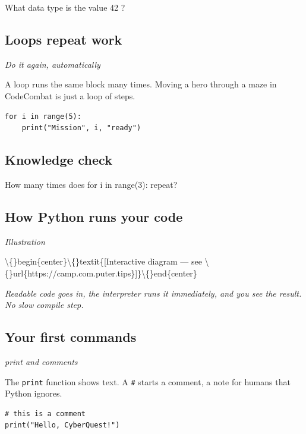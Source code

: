 \documentclass[12pt,openany]{book}
\begin{document}
What data type is the value 42 ?

\medskip

\subsection*{Loops repeat work}
{\small\itshape\color{gray}Do it again, automatically}


A loop runs the same block many times. Moving a hero through a maze in CodeCombat is just a loop of steps.

\begin{lstlisting}
for i in range(5):
    print("Mission", i, "ready")\end{lstlisting}

\medskip

\subsection*{Knowledge check}

How many times does for i in range(3): repeat?

\medskip

\subsection*{How Python runs your code}
{\small\itshape\color{gray}Illustration}

\textbackslash\{\}begin\{center\}\textbackslash\{\}textit\{[Interactive diagram --- see \textbackslash\{\}url\{https://camp.com.puter.tips\}]\}\textbackslash\{\}end\{center\}

{\small\itshape\color{gray}Readable code goes in, the interpreter runs it immediately, and you see the result. No slow compile step.}

\medskip

\subsection*{Your first commands}
{\small\itshape\color{gray}print and comments}


The \texttt{print} function shows text. A \texttt{\#} starts a comment, a note for humans that Python ignores.

\begin{lstlisting}
# this is a comment
print("Hello, CyberQuest!")\end{lstlisting}

\medskip
\end{document}
